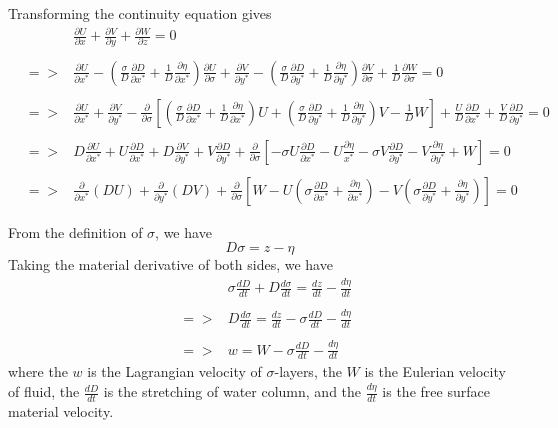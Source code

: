 \documentclass[oribibl]{llncs}
\begin{document}
Transforming the continuity equation gives
\begin{eqnarray}\label{eq:coneq2}
&& \frac{\partial U}{\partial x} + \frac{\partial V}{\partial y} + \frac{\partial W}{\partial z} = 0  \nonumber \\ \nonumber \\ 
&=>&  \frac{\partial U}{\partial x^*} - \left(  \frac{\sigma}{D} \frac{\partial D}{\partial x^*} + \frac{1}{D}\frac{\partial \eta}{\partial x^*}\right) \frac{\partial U}{\partial \sigma}  + \frac{\partial V}{\partial y^*} - \left(  \frac{\sigma}{D} \frac{\partial D}{\partial y^*} + \frac{1}{D}\frac{\partial \eta}{\partial y^*}\right) \frac{\partial V}{\partial \sigma}  +  \frac{1}{D}\frac{\partial W}{\partial \sigma} = 0  \nonumber \\ \nonumber \\ 
&=>&  \frac{\partial U}{\partial x^*} +  \frac{\partial V}{\partial y^*}  - \frac{\partial}{\partial \sigma} \left[   \left(  \frac{\sigma}{D} \frac{\partial D}{\partial x^*} + \frac{1}{D}\frac{\partial \eta}{\partial x^*}\right) U + \left(  \frac{\sigma}{D} \frac{\partial D}{\partial y^*} + \frac{1}{D}\frac{\partial \eta}{\partial y^*}\right)  V - \frac{1}{D}W \right] +\frac{U}{D}\frac{\partial D}{\partial x^*} +\frac{V}{D}\frac{\partial D}{\partial y^*} = 0   \nonumber \\ \nonumber \\
&=>& D\frac{\partial U}{\partial x^*} +  U\frac{\partial D}{\partial x^*} + D\frac{\partial V}{\partial y^*} +  V\frac{\partial D}{\partial y^*} + \frac{\partial}{\partial \sigma} \left[  -\sigma U \frac{\partial D}{\partial x^*} - U \frac{\partial \eta}{x^*} - \sigma V \frac{\partial D}{\partial y^*} -V\frac{\partial \eta}{\partial y^*} +W \right] = 0  \nonumber \\ \nonumber \\ 
&=>&  \frac{\partial}{\partial x^*}(DU) +\frac{\partial}{\partial y^*}(DV) + \frac{\partial}{\partial \sigma} \left[  W - U \left( \sigma \frac{\partial D}{\partial x^*} + \frac{\partial \eta}{\partial x^*}\right)  -V \left( \sigma \frac{\partial D}{\partial y^*} + \frac{\partial \eta}{\partial y^*}\right) \right] = 0
\end{eqnarray}

From the definition of $\sigma$, we have
\begin{equation}  
D\sigma=z-\eta
\end{equation}  
Taking the material derivative of both sides, we have 
\begin{eqnarray}  
&&\sigma \frac{d D}{d t} + D\frac{d \sigma}{dt} = \frac{d z}{d t} -\frac{d \eta}{d t}  \nonumber \\ \nonumber \\ 
&=>& D\frac{d \sigma}{dt} = \frac{d z}{d t} - \sigma \frac{d D}{d t} -\frac{d \eta}{d t}   \nonumber \\ \nonumber \\ 
&=>& w = W- \sigma \frac{d D}{d t} -\frac{d \eta}{d t}  
\end{eqnarray}  
where the $w$ is  the Lagrangian velocity of $\sigma$-layers, the $W$ is the Eulerian velocity of fluid, the $\frac{d D}{d t}$ is the stretching of water column, and the $\frac{d \eta}{d t} $ is the free surface material velocity.
\end{document}
